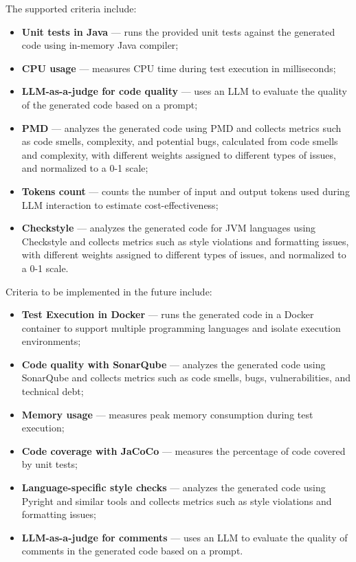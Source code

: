 The supported criteria include:
\begin{itemize}
    \item \textbf{Unit tests in Java} --- runs the provided unit tests against the generated code using in-memory Java compiler;
    \item \textbf{CPU usage} --- measures CPU time during test execution in milliseconds;
    \item \textbf{LLM-as-a-judge for code quality} --- uses an LLM to evaluate the quality of the generated code based on a prompt;
    \item \textbf{PMD} --- analyzes the generated code using PMD and collects metrics such as code smells, complexity, and potential bugs, calculated from code smells and complexity, with different weights assigned to different types of issues, and normalized to a 0-1 scale;
    \item \textbf{Tokens count} --- counts the number of input and output tokens used during LLM interaction to estimate cost-effectiveness;
    \item \textbf{Checkstyle} --- analyzes the generated code for JVM languages using Checkstyle and collects metrics such as style violations and formatting issues, with different weights assigned to different types of issues, and normalized to a 0-1 scale.
\end{itemize}

Criteria to be implemented in the future include:
\begin{itemize}
    \item \textbf{Test Execution in Docker} --- runs the generated code in a Docker container to support multiple programming languages and isolate execution environments;
    \item \textbf{Code quality with SonarQube} --- analyzes the generated code using SonarQube and collects metrics such as code smells, bugs, vulnerabilities, and technical debt;
    \item \textbf{Memory usage} --- measures peak memory consumption during test execution;
    \item \textbf{Code coverage with JaCoCo} --- measures the percentage of code covered by unit tests;
    \item \textbf{Language-specific style checks} --- analyzes the generated code using Pyright and similar tools and collects metrics such as style violations and formatting issues;
    \item \textbf{LLM-as-a-judge for comments} --- uses an LLM to evaluate the quality of comments in the generated code based on a prompt.
\end{itemize}

